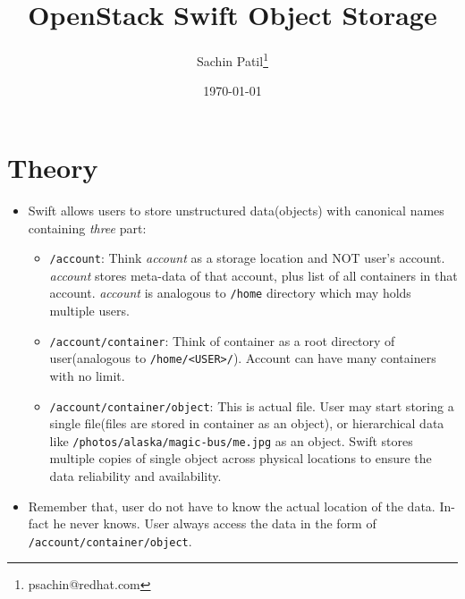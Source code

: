\documentclass{article}
\author{Sachin Patil\thanks{psachin@redhat.com}}
\date{\today}
\title{OpenStack Swift Object Storage}
\begin{document}
\maketitle

\section{Theory}
\label{sec:org640e7c9}
\begin{itemize}
\item Swift allows users to store unstructured data(objects) with
canonical names containing \emph{three} part:
\begin{itemize}
\item \texttt{/account}: Think \emph{account} as a storage location and NOT user's
account. \emph{account} stores meta-data of that account, plus
list of all containers in that account. \emph{account} is analogous
to \texttt{/home} directory which may holds multiple users.

\item \texttt{/account/container}: Think of container as a root directory
of user(analogous to \texttt{/home/<USER>/}). Account can have many
containers with no limit.

\item \texttt{/account/container/object}: This is actual file. User may
start storing a single file(files are stored in container as
an object), or hierarchical data like \newline
\texttt{/photos/alaska/magic-bus/me.jpg} as an object. Swift stores
multiple copies of single object across physical locations to
ensure the data reliability and availability.
\end{itemize}

\item Remember that, user do not have to know the actual location of the
data. In-fact he never knows. User always access the data in the
form of \texttt{/account/container/object}.
\end{itemize}
\end{document}
